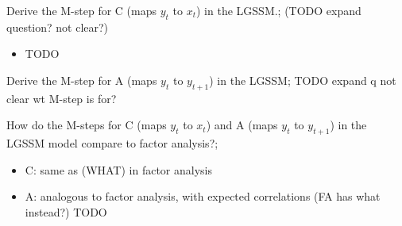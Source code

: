 \documentclass{article}
\begin{document}
Derive the M-step for C (maps $y_t$ to $x_t$) in the LGSSM.; (TODO expand question? not clear?) \begin{itemize}
    \item TODO 
\end{itemize}

Derive the M-step for A (maps $y_t$ to $y_{t+1}$) in the LGSSM; TODO expand q not clear wt M-step is for?

How do the M-steps for C (maps $y_t$ to $x_t$) and A (maps $y_t$ to $y_{t+1}$) in the LGSSM model compare to factor analysis?; \begin{itemize}
    \item C: same as (WHAT) in factor analysis
    \item A: analogous to factor analysis, with expected correlations (FA has what instead?) TODO
\end{itemize}
\end{document}
